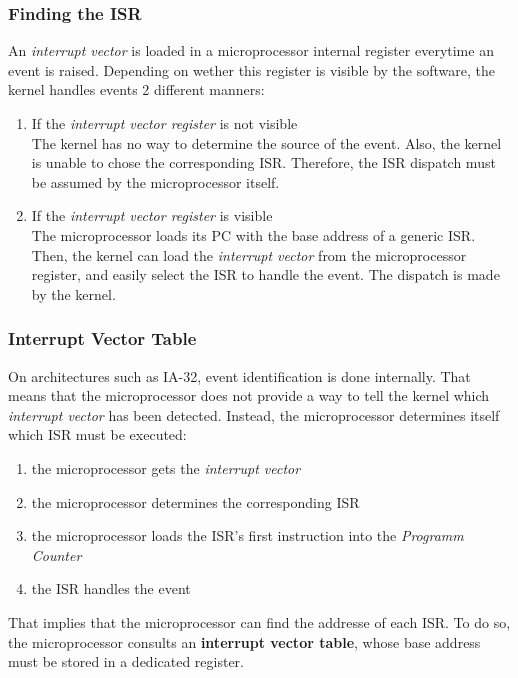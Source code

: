 \begin{frame}
  \frametitle{Finding the ISR}

  An {\em interrupt vector} is loaded in a microprocessor internal register
  everytime an event is raised. Depending on wether this register is visible
  by the software, the kernel handles events 2 different manners:

  \nl

  \begin{enumerate}
    \item If the {\em interrupt vector register} is not visible\\
      The kernel has no way to determine the source of the event. Also, the
      kernel is unable to chose the corresponding ISR. Therefore, the ISR
      dispatch must be assumed by the microprocessor itself.

      \nl

    \item If the {\em interrupt vector register} is visible\\
      The microprocessor loads its PC with the base address of a generic ISR.
      Then, the kernel can load the {\em interrupt vector} from the
      microprocessor register, and easily select the ISR to handle the event.
      The dispatch is made by the kernel.
  \end{enumerate}

\end{frame}


%
%
%

\begin{frame}
  \frametitle{Interrupt Vector Table}

  On architectures such as IA-32, event identification is done internally. That
  means that the microprocessor does not provide a way to tell the kernel which
  {\em interrupt vector} has been detected. Instead, the microprocessor
  determines itself which ISR must be executed:

  \nl

  \begin{enumerate}
    \item the microprocessor gets the {\em interrupt vector}
    \item the microprocessor determines the corresponding ISR
    \item the microprocessor loads the ISR's first instruction into the
      {\em Programm Counter}
    \item the ISR handles the event
  \end{enumerate}

  \nl

  That implies that the microprocessor can find the addresse of each ISR. To do
  so, the microprocessor consults an {\bf interrupt vector table}, whose base
  address must be stored in a dedicated register.

\end{frame}

